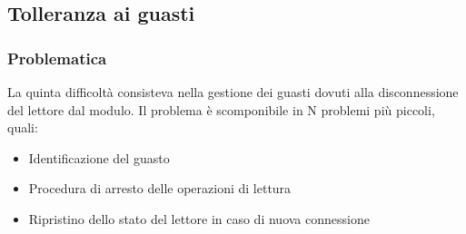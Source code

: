 \subsection{Tolleranza ai guasti}
\subsubsection*{Problematica}
La quinta difficoltà consisteva nella gestione dei guasti dovuti alla disconnessione del lettore dal modulo.
Il problema è scomponibile in N problemi più piccoli, quali:
\begin{itemize}
    \item Identificazione del guasto
    \item Procedura di arresto delle operazioni di lettura
    \item Ripristino dello stato del lettore in caso di nuova connessione
\end{itemize}


